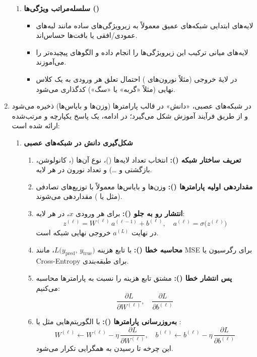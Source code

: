 \begin{enumerate}
\begin{enumerate}
		\item \textbf{سلسله‌مراتب ویژگی‌ها ()}
		\begin{itemize}
			\item لایه‌های ابتدایی شبکه‌های عمیق معمولاً به زیرویژگی‌های ساده مانند لبه‌های عمودی/افقی یا بافت‌ها حساس‌اند.
			\item لایه‌های میانی ترکیب این زیرویژگی‌ها را انجام داده و الگوهای پیچیده‌تر  را می‌آموزند.
			\item در لایهٔ خروجی (مثلاً نورون‌های ) احتمال تعلق هر ورودی به یک کلاس نهایی (مثلاً «گربه» یا «سگ») کدگذاری می‌شود.
		\end{itemize}
	\end{enumerate}
	
	\item در شبکه‌های عصبی، «دانش» در قالب پارامترها (وزن‌ها و بایاس‌ها) ذخیره می‌شود و از طریق فرآیند آموزش شکل می‌گیرد؛ در ادامه، یک پاسخ یکپارچه و مرتب‌شده ارائه شده است:
	
	\begin{enumerate}
		\item \textbf{شکل‌گیری دانش در شبکه‌های عصبی}
		\begin{enumerate}
			\item \textbf{تعریف ساختار شبکه ():}  
			انتخاب تعداد لایه‌ها ()، نوع آن‌ها (، کانولوشن، بازگشتی و …) و تعداد نورون در هر لایه.
			\item \textbf{مقداردهی اولیه پارامترها ():}  
			وزن‌ها و بایاس‌ها معمولاً با توزیع‌های تصادفی (مثل  یا ) مقداردهی می‌شوند.
			\item \textbf{انتشار رو به جلو ():}  
			برای هر ورودی \(x\)، در هر لایه:
			\[
			z^{(\ell)} = W^{(\ell)}\,a^{(\ell-1)} + b^{(\ell)}, 
			\quad
			a^{(\ell)} = \sigma\bigl(z^{(\ell)}\bigr)
			\]
			در نهایت \(a^{(L)}\) خروجی نهایی شبکه است.
			\item \textbf{محاسبه خطا ():}  
			با تابع هزینه \(L\bigl(y_{\text{pred}},\,y_{\text{true}}\bigr)\)، مانند MSE برای رگرسیون یا Cross-Entropy برای طبقه‌بندی.
			\item \textbf{پس انتشار خطا ():}  
			مشتق تابع هزینه را نسبت به پارامترها محاسبه می‌کنیم:
			\[
			\frac{\partial L}{\partial W^{(\ell)}},\quad
			\frac{\partial L}{\partial b^{(\ell)}}
			\]
			\item \textbf{به‌روزرسانی پارامترها ():}  
			با الگوریتم‌هایی مثل  یا :
			\[
			W^{(\ell)} \leftarrow W^{(\ell)} - \eta\,\frac{\partial L}{\partial W^{(\ell)}}, 
			\quad
			b^{(\ell)} \leftarrow b^{(\ell)} - \eta\,\frac{\partial L}{\partial b^{(\ell)}}
			\]
			این چرخه تا رسیدن به همگرایی تکرار می‌شود.
		\end{enumerate}
		

\end{enumerate}
\end{enumerate}
